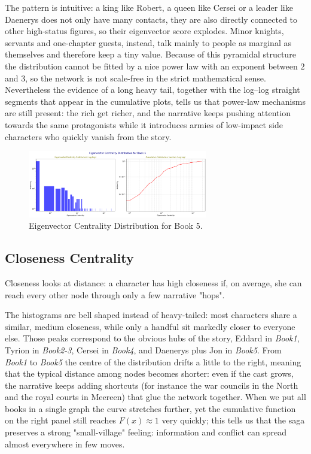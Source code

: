 \documentclass[12pt, a4paper]{article}
\begin{document}
The pattern is intuitive: a king like Robert, a queen like Cersei or a leader like Daenerys does not only have many contacts, they are also directly connected to other high-status figures, so their eigenvector score explodes.  Minor knights, servants and one-chapter guests, instead, talk mainly to people as marginal as themselves and therefore keep a tiny value.  Because of this pyramidal structure the distribution cannot be fitted by a nice power law with an exponent between $2$ and $3$, so the network is not scale-free in the strict mathematical sense.  Nevertheless the evidence of a long heavy tail, together with the log–log straight segments that appear in the cumulative plots, tells us that power-law mechanisms are still present: the rich get richer, and the narrative keeps pushing attention towards the same protagonists while it introduces armies of low-impact side characters who quickly vanish from the story.

\begin{figure}[htbp]
      \centering
      \includegraphics[width=0.7\textwidth]{eigenvector-book5.png}
      \caption{Eigenvector Centrality Distribution for Book 5.}
      \label{fig:eigenbook5}
\end{figure}

\FloatBarrier
\subsection*{Closeness Centrality}
Closeness looks at distance: a character has high closeness if,
on average, she can reach every other node through only a few narrative "hops".


The histograms are bell shaped instead of heavy-tailed: most characters share a similar, medium closeness, while only a handful sit markedly closer to everyone else.  Those peaks correspond to the obvious hubs of the story, Eddard in \emph{Book1}, Tyrion in \emph{Book2-3}, Cersei in \emph{Book4}, and Daenerys plus Jon in \emph{Book5}.
From \emph{Book1} to \emph{Book5} the centre of the distribution drifts a little to the right, meaning that the typical distance among nodes becomes shorter: even if the cast grows, the narrative keeps adding shortcuts (for instance the war councils in the North and the royal courts in Meereen) that glue the network together.
When we put all books in a single graph the curve stretches further, 
yet the cumulative function on the right panel still reaches $F(x)\approx1$ 
very quickly; this tells us that the saga preserves a strong "small-village" feeling: 
information and conflict can spread almost everywhere in  few moves.
\end{document}
